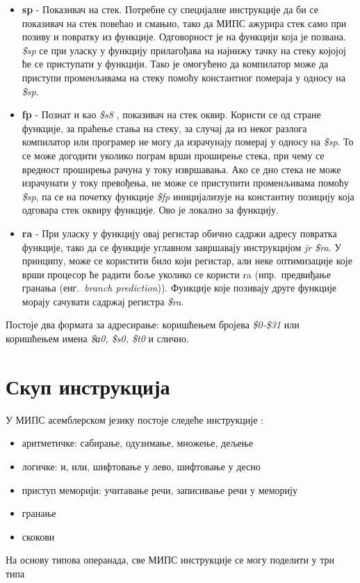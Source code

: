 \documentclass[12pt,oneside]{memoir}
\begin{document}
\begin{itemize}
\item \textbf{sp} - Показивач на стек. Потребне су специјалне инструкције да би се показивач на стек повећао и смањио, тако да МИПС ажурира стек само при позиву и повратку из функције. Одговорност је на функцији која је позвана. \textit{\$sp} се при уласку у функцију прилагођава на најнижу тачку на стеку којојој ће се приступати у функцији. Тако је омогућено да компилатор може да приступи променљивама на стеку помоћу константног помераја у односу на \textit{\$sp}.

\item \textbf{fp} - Познат и као \textit{\$s8} , показивач на стек оквир. Користи се од стране функције, за праћење стања на стеку, за случај да из неког разлога компилатор или програмер не могу да израчунају померај у односу на \textit{\$sp}. То се може догодити уколико пограм врши проширење стека, при чему се вредност проширења рачуна у току извршавања. Ако се дно стека не може израчунати у току превођења, не може се приступити променљивама помоћу \textit{\$sp}, па се на почетку функције \textit{\$fp} иницијализује на константну позицију која одговара стек оквиру функције. Ово је локално за функцију.

\item \textbf{ra} - При уласку у функцију овај регистар обично садржи адресу повратка функције, тако да се функције углавном завршавају инструкцијом \textit{jr \$ra}. У принципу, може се користити било који регистар, али неке оптимизације које врши процесор ће радити боље уколико се користи ra (нпр.~предвиђање гранања (енг.~\textit{branch prediction})). Функције које позивају друге функције морају сачувати садржај регистра \textit{\$ra}.
\end{itemize}

Постоје два формата за адресирање: коришћењем бројева \textit{\$0-\$31} или коришћењем имена \textit{\$а0, \$s0, \$t0} и слично.

\section{Скуп инструкција}
\label{instructions}
У МИПС асемблерском језику постоје следеће инструкције \cite{mips1}:
\begin{itemize}
\item аритметичке: сабирање, одузимање, множење, дељење
\item логичке: и, или, шифтовање у лево, шифтовање у десно
\item приступ меморији: учитавање речи, записивање речи у меморију
\item гранање
\item скокови
\end{itemize}
На основу типова операнада, све МИПС инструкције се могу поделити у три типа \cite{mips}
\end{document}
